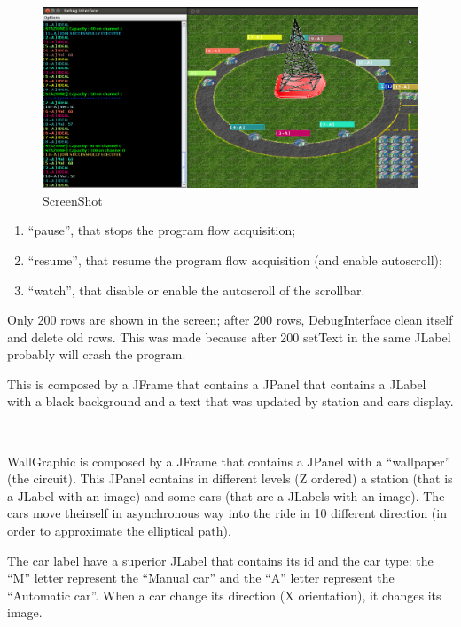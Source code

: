 \documentclass[a4paper,titlepage]{article}
\begin{document}
\begin{figure}[!h]
\centering
\includegraphics[scale=0.3]{screen.png}
\caption{ScreenShot}
\end{figure}

\begin {enumerate}

\item ``pause'', that stops the program flow acquisition;

\item ``resume'', that resume the program flow acquisition (and enable autoscroll);

\item ``watch'', that disable or enable the autoscroll of the scrollbar.    

\end{enumerate}

Only 200 rows are shown in the screen; after 200 rows, DebugInterface clean itself and delete old rows. This was made because after 200 setText in the same JLabel probably will crash the program.

This is composed by a JFrame that contains a JPanel that contains a JLabel with a black background and a text that was updated by station and cars display.

~

WallGraphic is composed by a JFrame that contains a JPanel with a ``wallpaper'' (the circuit). This JPanel contains in different levels (Z ordered) a station (that is a JLabel with an image) and some cars (that are a JLabels with an image). The cars move theirself in asynchronous way into the ride in 10 different direction (in order to approximate the elliptical path).

The car label have a superior JLabel that contains its id and the car type: the ``M'' letter represent the ``Manual car'' and the ``A'' letter represent the ``Automatic car''. When a car change its direction (X orientation), it changes its image.
\end{document}
